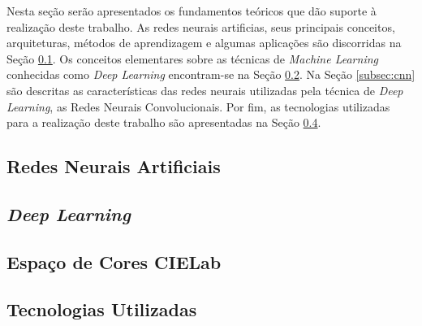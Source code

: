 Nesta seção serão apresentados os fundamentos teóricos que dão suporte à realização deste trabalho. As redes neurais artificias, seus principais conceitos, arquiteturas, métodos de aprendizagem e algumas aplicações são discorridas na Seção \ref{subsec:rna}. Os conceitos elementares sobre as técnicas de \textit{Machine Learning} conhecidas como \textit{Deep Learning} encontram-se na Seção \ref{subsec:deep}. Na Seção \ref{subsec:cnn} são descritas as características das redes neurais utilizadas pela técnica de \textit{Deep Learning}, as Redes Neurais Convolucionais. Por fim, as tecnologias utilizadas para a realização deste trabalho são apresentadas na Seção \ref{subsec:tecnologias}.

\subsection{Redes Neurais Artificiais} \label{subsec:rna}


\subsection{\textit{Deep Learning}} \label{subsec:deep}


\subsection{Espaço de Cores CIELab}

\subsection{Tecnologias Utilizadas} \label{subsec:tecnologias}

